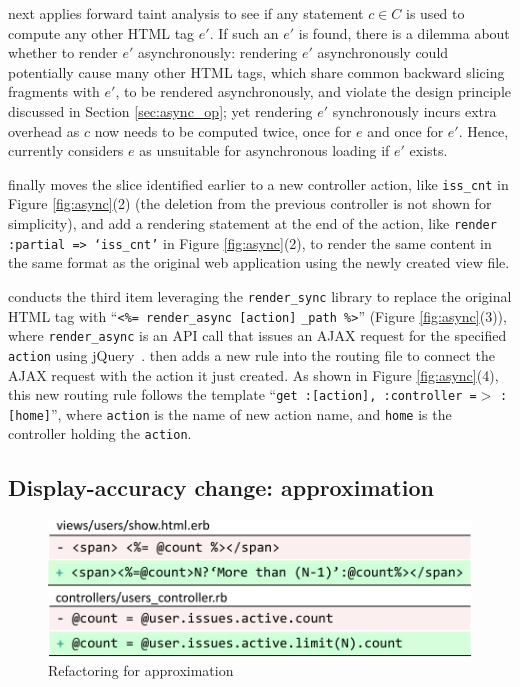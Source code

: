\Tool next applies forward taint analysis to see if any statement $c \in C$
is used to compute any other HTML tag $e'$. If such an $e'$ is
found, there is a dilemma about whether to render $e'$ asynchronously: 
rendering $e'$ asynchronously could potentially
cause many other HTML tags, which share common backward slicing
fragments with $e'$, to be rendered asynchronously, and violate the 
design principle discussed in Section \ref{sec:async_op}; yet rendering $e'$ synchronously
incurs extra overhead as $c$ now needs to be computed twice,
once for $e$ and once for $e'$. 
Hence, \Tool currently considers $e$ as unsuitable for asynchronous loading if $e'$ exists. 

\Tool finally moves the slice identified earlier to a new controller action, like
{\tt iss\_cnt} in Figure \ref{fig:async}(2) (the deletion from the previous controller is not shown for simplicity), and add a rendering statement
at the end of the action,
like  {\tt render :partial => `iss\_cnt'} in Figure \ref{fig:async}(2),
to render the same content
in the same format as the original web application using the newly created view file.

\Tool conducts the third item leveraging the {\tt render\_sync} library \cite{asyncgem} to replace the original HTML tag with 
``{\tt<\%= render\_async [action]}
{\tt \_path \%>}'' (Figure \ref{fig:async}(3)), where {\tt render\_async}
is an API call that issues an AJAX request for the specified
{\tt action} using jQuery~\cite{jquery}.
\Tool then adds a new rule into the routing file
to connect the AJAX request with the action it just created.
As shown in  
Figure \ref{fig:async}(4), this new routing rule follows the template
``{\tt get :[action], :controller =$>$} {\tt :[home]}'', 
where {\tt action} is the name of new action name, and 
{\tt home} is the controller holding the {\tt action}.


\subsection{Display-accuracy change: approximation}
\label{sec:approx}

\begin{figure}
    \centering
    \includegraphics[width=\columnwidth]{panorama-figs/approxi.pdf}
    \caption{Refactoring for approximation}
    \label{fig:approxi}
    \vspace{-0.2in}
\end{figure}

